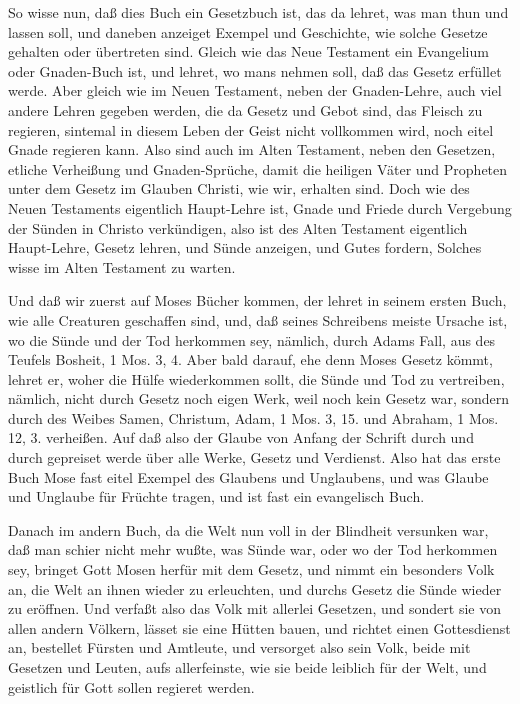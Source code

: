 So wisse nun, daß dies Buch ein Gesetzbuch ist, das da lehret, was man thun und lassen soll, und daneben anzeiget Exempel und Geschichte, wie solche Gesetze gehalten oder übertreten sind. Gleich wie das Neue Testament ein Evangelium oder Gnaden-Buch ist, und lehret, wo mans nehmen soll, daß das Gesetz erfüllet werde. Aber gleich wie im Neuen Testament, neben der Gnaden-Lehre, auch viel andere Lehren gegeben werden, die da Gesetz und Gebot sind, das Fleisch zu regieren, sintemal in diesem Leben der Geist nicht vollkommen wird, noch eitel Gnade regieren kann. Also sind auch im Alten Testament, neben den Gesetzen, etliche Verheißung und Gnaden-Sprüche, damit die heiligen Väter und Propheten unter dem Gesetz im Glauben Christi, wie wir, erhalten sind. Doch wie des Neuen Testaments eigentlich Haupt-Lehre ist, Gnade und Friede durch Vergebung der Sünden in Christo verkündigen, also ist des Alten Testament eigentlich Haupt-Lehre, Gesetz lehren, und Sünde anzeigen, und Gutes fordern, Solches wisse im Alten Testament zu warten.


Und daß wir zuerst auf Moses Bücher kommen, der lehret in seinem ersten Buch, wie alle Creaturen geschaffen sind, und, daß seines Schreibens meiste Ursache ist, wo die Sünde und der Tod herkommen sey, nämlich, durch Adams Fall, aus des Teufels Bosheit, 1 Mos. 3, 4. Aber bald darauf, ehe denn Moses Gesetz kömmt, lehret er, woher die Hülfe wiederkommen sollt, die Sünde und Tod zu vertreiben, nämlich, nicht durch Gesetz noch eigen Werk, weil noch kein Gesetz war, sondern durch des Weibes Samen, Christum, Adam, 1 Mos. 3, 15. und Abraham, 1 Mos. 12, 3. verheißen. Auf daß also der Glaube von Anfang der Schrift durch und durch gepreiset werde über alle Werke, Gesetz und Verdienst. Also hat das erste Buch Mose fast eitel Exempel des Glaubens und Unglaubens, und was Glaube und Unglaube für Früchte tragen, und ist fast ein evangelisch Buch.

Danach im andern Buch, da die Welt nun voll in der Blindheit versunken war, daß man schier nicht mehr wußte, was Sünde war, oder wo der Tod herkommen sey, bringet Gott Mosen herfür mit dem Gesetz, und nimmt ein besonders Volk an, die Welt an ihnen wieder zu erleuchten, und durchs Gesetz die Sünde wieder zu eröffnen. Und verfaßt also das Volk mit allerlei Gesetzen, und sondert sie von allen andern Völkern, lässet sie eine Hütten bauen, und richtet einen Gottesdienst an, bestellet Fürsten und Amtleute, und versorget also sein Volk, beide mit Gesetzen und Leuten, aufs allerfeinste, wie sie beide leiblich für der Welt, und geistlich für Gott sollen regieret werden.

